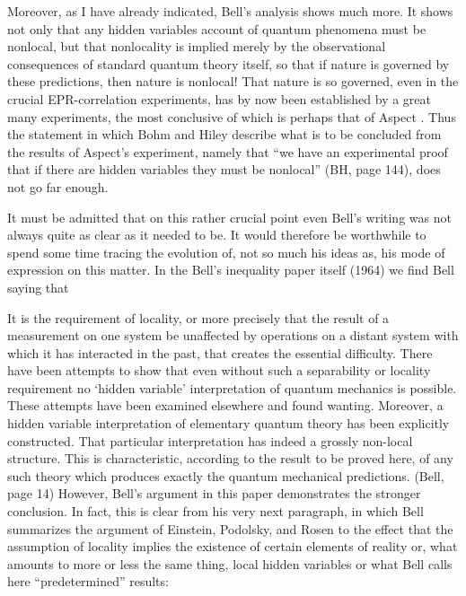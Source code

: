 Moreover, as I have already indicated, Bell's analysis shows much more. It
shows not only that any hidden variables account of quantum phenomena must
be nonlocal, but that nonlocality is implied merely by the observational
consequences of standard quantum theory itself, so that if nature is
governed by these predictions, then nature is nonlocal!  That nature is so
governed, even in the crucial EPR-correlation experiments, has by now been
established by a great many experiments, the most conclusive of which is
perhaps that of Aspect \cite{Aspect}.  Thus the statement in which Bohm and
Hiley describe what is to be concluded from the results of Aspect's
experiment, namely that ``we have an experimental proof that if there are
hidden variables they must be nonlocal'' (BH, page 144), does not go far
enough.

It must be admitted that on this rather crucial point even Bell's writing
was not always quite as clear as it needed to be.  It would therefore be
worthwhile to spend some time tracing the evolution of, not so much his
ideas as, his mode of expression on this matter.  In the Bell's inequality
paper itself (1964) we find Bell saying that

\bq \noindent It is the requirement of locality, or more precisely that the
result of a measurement on one system be unaffected by operations on a
distant system with which it has interacted in the past, that creates the
essential difficulty. There have been attempts to show that even without
such a separability or locality requirement no `hidden variable'
interpretation of quantum mechanics is possible. These attempts have been
examined elsewhere and found wanting. Moreover, a hidden variable
interpretation of elementary quantum theory has been explicitly
constructed. That particular interpretation has indeed a grossly non-local
structure. This is characteristic, according to the result to be proved
here, of any such theory which produces exactly the quantum mechanical
predictions. (Bell, page 14)
\eq
However, Bell's argument in this paper demonstrates the stronger
conclusion. In fact, this is clear from his very next paragraph, in which
Bell summarizes the argument of Einstein, Podolsky, and Rosen to the effect
that the assumption of locality implies the existence of certain elements
of reality or, what amounts to more or less the same thing, local hidden
variables or what Bell calls here ``predetermined'' results:

